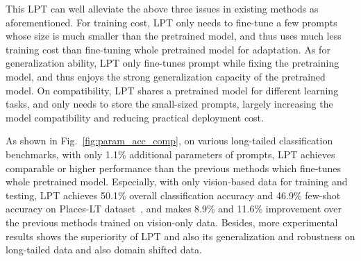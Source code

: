 \documentclass{article} \usepackage{iclr2023_conference,times}
\begin{document}
This LPT can well alleviate the above three issues in existing methods as aforementioned. For training cost, LPT only needs to fine-tune a few prompts whose size  is much smaller than the pretrained model, and thus uses much less training cost than fine-tuning whole pretrained model for adaptation. As for generalization ability, LPT only fine-tunes prompt while fixing the pretraining model, and thus enjoys the strong generalization capacity of the pretrained model. On compatibility, LPT shares a pretrained model for different learning tasks, and only needs to store the small-sized prompts, largely increasing  the model compatibility and reducing practical deployment cost. 










As shown in Fig.~\ref{fig:param_acc_comp},  on various long-tailed classification benchmarks, with only 1.1\% additional  parameters of prompts, LPT achieves comparable or higher performance than the previous methods which fine-tunes whole pretrained model.  
Especially, with only vision-based data for training and testing, LPT achieves 50.1\% overall classification accuracy and 46.9\% few-shot accuracy on Places-LT dataset~\citep{zhou2017places}, and makes 8.9\% and 11.6\% improvement over the  previous  methods trained on vision-only data.
Besides, more experimental results shows the superiority of LPT and also its generalization and robustness on long-tailed data and also  domain shifted data.


\vspace{-0.8em}
\end{document}
